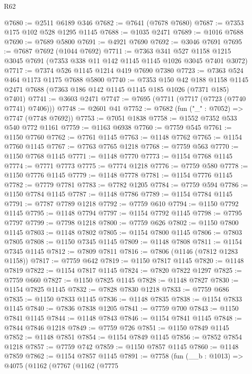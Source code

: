 \begin{lexlean}{R62}
\begin{coremodule}
@7680 := @2511 @6189 @346
@7682 := @7641 (@7678 @7680)
@7687 := @7353 @175 @102 @528 @1295 @1145
@7688 := @1035 @2471
@7689 := @1016 @7688
@7690 := @7689 @5800
@7691 := @4921 @7690
@7692 := @3046 @7691
@7695 := @7687 @7692 (@1044 @7692)
@7711 := @7363
    @341
    @527
    @1158
    @1215
    @3045
    @7691
    (@7353 @338 @11 @142 @1145 @1145 @1026 @3045 @7401 @3072)
@7717 := @7374 @526 @1145 @1214 @419 @7690 @7380
@7723 := @7363 @524 @464 @1173 @1175 @7688 @5800
@7740 := @7353
    @150
    @42
    @188
    @1158
    @1145
    @2471
    @7688
    (@7363 @186 @142 @1145 @1145 @185 @1026 (@7371 @185) @7401)
@7741 := @3603 @2471
@7747 := @7695 (@7711 (@7717 (@7723 (@7740 @7741) @7406)))
@7748 := @2601 @41
@7752 := @7682 (fun ("_" : @7052) => @7747 (@7748 @7692))
@7753 := @7051 @1838
@7758 := @1552 @7352 @533 @540 @772 @1161
@7759 := @1163 @6938
@7760 := @7759 @545
@7761 := @1150 @7760
@7762 := @7761 @1145
@7763 := @1148 @7762
@7765 := @1154 @7760 @1145
@7767 := @7763 @7765 @1218
@7768 := @7759 @563
@7770 := @1150 @7768 @1145
@7771 := @1148 @7770
@7773 := @1154 @7768 @1145
@7774 := @7771 @7773
@7775 := @7774 @1218
@7776 := @7759 @580
@7778 := @1150 @7776 @1145
@7779 := @1148 @7778
@7781 := @1154 @7776 @1145
@7782 := @7779 @7781
@7783 := @7782 @1205
@7784 := @7759 @594
@7786 := @1150 @7784 @1145
@7787 := @1148 @7786
@7789 := @1154 @7784 @1145
@7791 := @7787 @7789 @1218
@7792 := @7759 @610
@7794 := @1150 @7792 @1145
@7795 := @1148 @7794
@7797 := @1154 @7792 @1145
@7798 := @7795 @7797
@7799 := @7798 @1218
@7800 := @7759 @626
@7802 := @1150 @7800 @1145
@7803 := @1148 @7802
@7805 := @1154 @7800 @1145
@7806 := @7803 @7805
@7808 := @1150 @7345 @1145
@7809 := @1148 @7808
@7811 := @1154 @7345 @1145
@7812 := @7809 @7811
@7816 := @7806 (@1146 (@7812 @1283 @1158))
@7817 := @7759 @642
@7819 := @1150 @7817 @1145
@7820 := @1148 @7819
@7822 := @1154 @7817 @1145
@7824 := @7820 @7822 @1297
@7825 := @7759 @660
@7827 := @1150 @7825 @1145
@7828 := @1148 @7827
@7830 := @1154 @7825 @1145
@7832 := @7828 @7830 @1218
@7833 := @7759 @686
@7835 := @1150 @7833 @1145
@7836 := @1148 @7835
@7838 := @1154 @7833 @1145
@7840 := @7836 @7838 @1205
@7841 := @7759 @700
@7843 := @1150 @7841 @1145
@7844 := @1148 @7843
@7846 := @1154 @7841 @1145
@7848 := @7844 @7846 @1218
@7849 := @7759 @726
@7851 := @1150 @7849 @1145
@7852 := @1148 @7851
@7854 := @1154 @7849 @1145
@7856 := @7852 @7854 @1218
@7857 := @7759 @742
@7859 := @1150 @7857 @1145
@7860 := @1148 @7859
@7862 := @1154 @7857 @1145
@7891 := @7758
    (fun (__b : @1013) =>
    @4075
      (@1162
        (@7767
          (@1162
            (@7775

\end{coremodule}
\end{lexlean}
